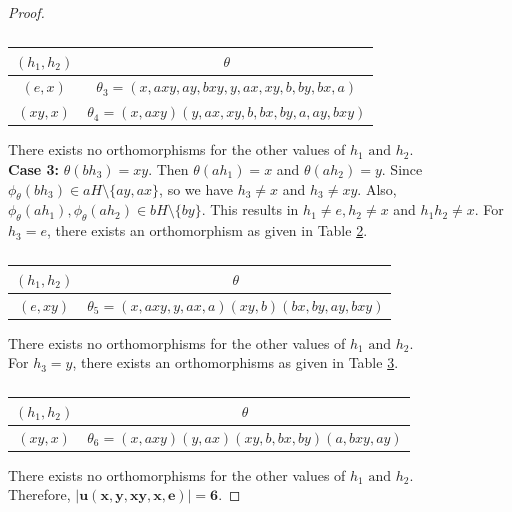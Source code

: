 \documentclass[11pt,a4paper]{article}
\theoremstyle{definition}
\theoremstyle{remark}
\begin{document}
\begin{proof}
\begin{table}[H]
\begin{center}
		\begin{tabular}{|c|c|}
		\hline
		$(h_{1},h_{2})$ & $\theta$\\ \hline
		$(e,x)$ &  $\theta_{3} = (x,axy,ay,bxy,y,ax,xy,b,by,bx,a)$ \\ \hline
		$(xy,x)$ & $\theta_{4} = (x,axy)(y,ax,xy,b,bx,by,a,ay,bxy)$ \\ \hline
	\end{tabular} \caption{} \label{t17}
\end{center}
\end{table}
\vspace{-.7cm}
	There exists no orthomorphisms for the other values of $h_{1} \text{ and } h_{2}$.\\
\textbf{Case 3:}  $\theta(bh_{3}) = xy.$ Then $\theta(ah_{1}) = x$ and $\theta(ah_{2}) = y$. Since $\phi_{\theta}(bh_{3}) \in aH \setminus \{ay,ax\}$, so we have $h_{3} \neq x$ and $h_{3} \neq xy$. Also, $\phi_{\theta}(ah_{1}), \phi_{\theta}(ah_{2}) \in bH\setminus \{by\}.$ This results in $h_{1} \neq e, h_{2} \neq x$ and $h_{1}h_{2} \neq x$. For $h_{3} = e$, there exists an orthomorphism as given in Table \ref{t18}.
\begin{table}[H]
\begin{center}
		\begin{tabular}{|c|c|}
		\hline
		$(h_{1},h_{2})$ & $\theta$\\ \hline
		$(e,xy)$ &  $\theta_{5} = (x,axy,y,ax,a)(xy,b)(bx,by,ay,bxy)$ \\ \hline
	\end{tabular}\caption{} \label{t18}
\end{center}
\end{table}
\vspace{-.7cm}
	There exists no orthomorphisms for the other values of $h_{1} \text{ and } h_{2}.$\\
For $h_{3} = y$, there exists an orthomorphisms as given in Table \ref{t19}.
\begin{table}[H]
	\begin{center}
		\begin{tabular}{|c|c|}
		\hline
		$(h_{1},h_{2})$ & $\theta$\\ \hline
		$(xy,x)$ &  $\theta_{6} = (x,axy)(y,ax)(xy,b,bx,by)(a,bxy,ay)$ \\ \hline
	\end{tabular} \caption{} \label{t19}
	\end{center}
\end{table}
\vspace{-.7cm}
	There exists no orthomorphisms for the other values of $h_{1} \text{ and } h_{2}$.\\
Therefore, $\bm{\vert u(x,y,xy,x,e) \vert = 6}$.
\end{proof}
\end{document}
